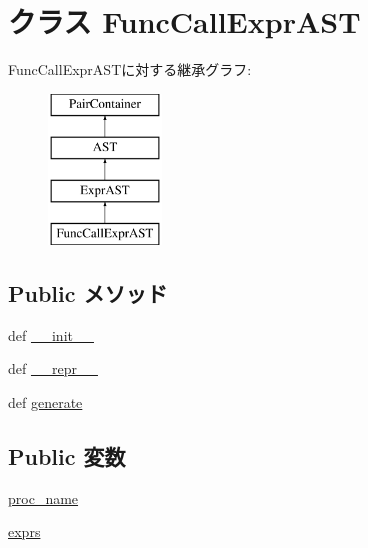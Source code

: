 \hypertarget{classslicc_1_1ast_1_1FuncCallExprAST_1_1FuncCallExprAST}{
\section{クラス FuncCallExprAST}
\label{classslicc_1_1ast_1_1FuncCallExprAST_1_1FuncCallExprAST}
}
FuncCallExprASTに対する継承グラフ:\begin{figure}[H]
\begin{center}
\leavevmode
\includegraphics[height=4cm]{classslicc_1_1ast_1_1FuncCallExprAST_1_1FuncCallExprAST}
\end{center}
\end{figure}
\subsection*{Public メソッド}
\begin{DoxyCompactItemize}
\item 
def \hyperlink{classslicc_1_1ast_1_1FuncCallExprAST_1_1FuncCallExprAST_ac775ee34451fdfa742b318538164070e}{\_\-\_\-init\_\-\_\-}
\item 
def \hyperlink{classslicc_1_1ast_1_1FuncCallExprAST_1_1FuncCallExprAST_ad8b9328939df072e4740cd9a63189744}{\_\-\_\-repr\_\-\_\-}
\item 
def \hyperlink{classslicc_1_1ast_1_1FuncCallExprAST_1_1FuncCallExprAST_a4555d1cee0dccf3942ea35fe86de2e8e}{generate}
\end{DoxyCompactItemize}
\subsection*{Public 変数}
\begin{DoxyCompactItemize}
\item 
\hyperlink{classslicc_1_1ast_1_1FuncCallExprAST_1_1FuncCallExprAST_a314cb734bd4ff35f0428eef1257546cf}{proc\_\-name}
\item 
\hyperlink{classslicc_1_1ast_1_1FuncCallExprAST_1_1FuncCallExprAST_a0e045096b5b64a9a2770f26d8642a62a}{exprs}
\end{DoxyCompactItemize}


